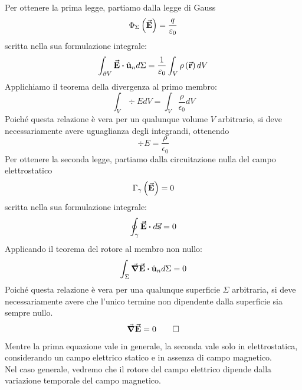 \begin{demonstration}
	Per ottenere la prima legge, partiamo dalla legge di Gauss
	\begin{equation}
		\Phi_\Sigma\left(\vb*{\va{E}}\right)=\frac{q}{\varepsilon_0}
	\end{equation}
scritta nella sua formulazione integrale:
	\begin{equation*}
		\int_{\partial V}\vba{E}\vdot\vbh{u}_nd\Sigma=\frac{1}{\epsilon_0}\int_{V}\rho\left(\vba{r}\right)dV
	\end{equation*}
Applichiamo il teorema della divergenza al primo membro:
\begin{equation*}
	\int_V\div{E}dV=\int_V\frac{\rho}{\epsilon_0}dV
\end{equation*}
Poiché questa relazione è vera per un qualunque volume $V$ arbitrario, si deve necessariamente avere uguaglianza degli integrandi, ottenendo
\begin{equation*}
	\div{E}=\frac{\rho}{\epsilon_0}
\end{equation*}
Per ottenere la seconda legge, partiamo dalla circuitazione nulla del campo elettrostatico
\begin{equation*}
	\Gamma_{\gamma}\left(\vb*{\va{E}}\right)=0
\end{equation*}
scritta nella sua formulazione integrale:
\begin{equation*}
	\oint_{\gamma}\vba{E}\vdot d\vba{s}=0
\end{equation*}
Applicando il teorema del rotore al membro non nullo:
\begin{equation*}
	\int_{\Sigma}\grad{\vba{E}}\vdot \vbh{u}_nd\Sigma=0
\end{equation*}
Poiché questa relazione è vera per una qualunque superficie $\Sigma$ arbitraria, si deve necessariamente avere che l'unico termine non dipendente dalla superficie sia sempre nullo.
\begin{equation*}
	\grad{\vb*{\va{E}}}=0\qedhere
\end{equation*}
\end{demonstration}
\begin{observe}
	Mentre la prima equazione vale in generale, la seconda vale solo in elettrostatica, considerando un campo elettrico statico e in assenza di campo magnetico.\\
	Nel caso generale, vedremo che il rotore del campo elettrico dipende dalla variazione temporale del campo magnetico.
\end{observe}
